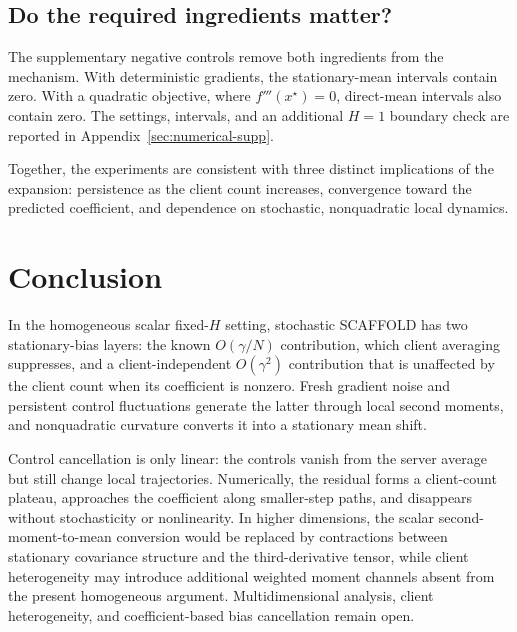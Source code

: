 \documentclass[11pt]{article}
\theoremstyle{definition}
\newcommand{\Scaf}{\textnormal{\textsc{SCAFFOLD}}}
\begin{document}
\subsection{Do the required ingredients matter?}
\label{sec:num-removal}

The supplementary negative controls remove both ingredients from the mechanism. With deterministic gradients, the stationary-mean intervals contain zero. With a quadratic objective, where $f'''(x^\star)=0$, direct-mean intervals also contain zero. The settings, intervals, and an additional $H=1$ boundary check are reported in Appendix~\ref{sec:numerical-supp}.

Together, the experiments are consistent with three distinct implications of the expansion: persistence as the client count increases, convergence toward the predicted coefficient, and dependence on stochastic, nonquadratic local dynamics.

\FloatBarrier

\section{Conclusion}
\label{sec:conclusion}
In the homogeneous scalar fixed-$H$ setting, stochastic \Scaf{} has two stationary-bias layers: the known $O(\gamma/N)$ contribution, which client averaging suppresses, and a client-independent $O(\gamma^2)$ contribution that is unaffected by the client count when its coefficient is nonzero. Fresh gradient noise and persistent control fluctuations generate the latter through local second moments, and nonquadratic curvature converts it into a stationary mean shift.

Control cancellation is only linear: the controls vanish from the server average but still change local trajectories. Numerically, the residual forms a client-count plateau, approaches the coefficient along smaller-step paths, and disappears without stochasticity or nonlinearity. In higher dimensions, the scalar second-moment-to-mean conversion would be replaced by contractions between stationary covariance structure and the third-derivative tensor, while client heterogeneity may introduce additional weighted moment channels absent from the present homogeneous argument. Multidimensional analysis, client heterogeneity, and coefficient-based bias cancellation remain open.


\clearpage
\begingroup
\raggedright


\endgroup

\clearpage
\appendix
\end{document}
